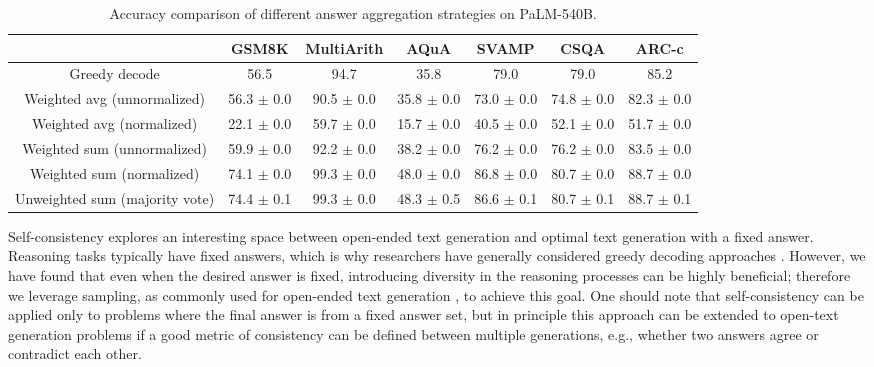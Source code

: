 \documentclass{article} %
\begin{document}
\begin{table}[t]
\small
\setlength\tabcolsep{4pt}
    \centering
    \vspace{-0.1in}
    \begin{tabular}{c cccccc}
    \toprule
         & GSM8K  & MultiArith & AQuA & SVAMP & CSQA & ARC-c \\
         \midrule
       Greedy decode & 56.5 & 94.7 & 35.8 & 79.0 & 79.0 & 85.2\\
       \midrule
       Weighted avg (unnormalized) & 56.3 \scriptsize{$\pm$ 0.0} & 90.5 \scriptsize{$\pm$ 0.0} & 35.8 \scriptsize{$\pm$ 0.0} & 73.0 \scriptsize{$\pm$ 0.0} & 74.8 \scriptsize{$\pm$ 0.0} & 82.3 \scriptsize{$\pm$ 0.0} \\
       Weighted avg (normalized) & 22.1 \scriptsize{$\pm$ 0.0} & 59.7 \scriptsize{$\pm$ 0.0} & 15.7 \scriptsize{$\pm$ 0.0} & 40.5 \scriptsize{$\pm$ 0.0} & 52.1 \scriptsize{$\pm$ 0.0} & 51.7 \scriptsize{$\pm$ 0.0}\\
       \midrule
       Weighted sum (unnormalized) & 59.9 \scriptsize{$\pm$ 0.0} & 92.2 \scriptsize{$\pm$ 0.0} & 38.2 \scriptsize{$\pm$ 0.0} & 76.2 \scriptsize{$\pm$ 0.0} & 76.2 \scriptsize{$\pm$ 0.0} & 83.5 \scriptsize{$\pm$ 0.0} \\
       Weighted sum (normalized) & 74.1 \scriptsize{$\pm$ 0.0} & 99.3 \scriptsize{$\pm$ 0.0} & 48.0 \scriptsize{$\pm$ 0.0} & 86.8 \scriptsize{$\pm$ 0.0} & 80.7 \scriptsize{$\pm$ 0.0} & 88.7 \scriptsize{$\pm$ 0.0}\\
       \midrule
       Unweighted sum (majority vote) & 74.4 \scriptsize{$\pm$ 0.1} & 99.3 \scriptsize{$\pm$ 0.0} & 48.3 \scriptsize{$\pm$ 0.5} & 86.6 \scriptsize{$\pm$ 0.1} & 80.7 \scriptsize{$\pm$ 0.1} & 88.7 \scriptsize{$\pm$ 0.1} \\
       \bottomrule
    \end{tabular}
    \vspace{-0.1in}
    \caption{Accuracy comparison of different answer aggregation strategies on PaLM-540B.}
    \label{tab:aggregation}
\vspace{-0.1in}
\end{table}


Self-consistency explores an interesting space between open-ended text generation and optimal text generation with a fixed answer.
Reasoning tasks typically have fixed answers, which is why researchers have generally considered greedy decoding approaches  \citep{Radford2019LanguageMA,wei2022chain,palm}. 
However, we have found that even when the desired answer is fixed, introducing diversity in the reasoning processes can be highly beneficial; therefore we leverage sampling, as commonly used for open-ended text generation \citep{Radford2019LanguageMA,brown2020language,thoppilan2022lamda}, to achieve this goal.
One should note that self-consistency can be applied only to problems where the final answer is from a fixed answer set, but in principle this approach can be extended to open-text generation problems if a good metric of consistency can be defined between multiple generations, e.g., whether two answers agree or contradict each other.
\end{document}
